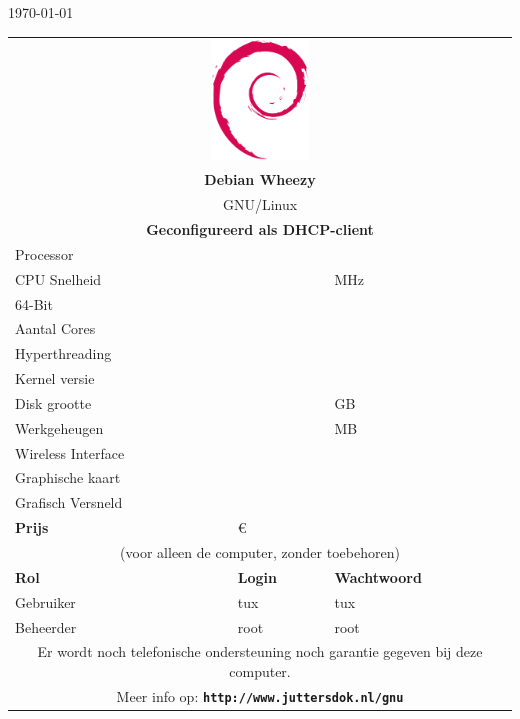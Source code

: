 \documentclass[a4paper,14pt]{extarticle}
\begin{document}

\centerline{\today}
\vskip 0.5cm
\begin{center}
	\begin{tabular}{ |p{6cm}| p{6cm}| l| }
	\multicolumn{3}{c}{\includegraphics[width=0.2\textwidth]{swirl}} \\
	\multicolumn{3}{c}{\Huge\bf{Debian Wheezy \debianversion}}\\
	\multicolumn{3}{c}{\LARGE{GNU/Linux}}\\
	\multicolumn{3}{c}{\bf Geconfigureerd als DHCP-client}\\
	\hline
	Processor & \multicolumn{2}{l|}{\cpumodel{}}  \\
	CPU Snelheid & \cpuspeed{} & MHz \\
	64-Bit & \bitssixtyfour{} & \\
	Aantal Cores & \corecount{} & \\
	Hyperthreading & \hyperthreading{} & \\
	Kernel versie & {} & \\
	Disk grootte & \disksize{} & GB \\
	Werkgeheugen & \memsize{} & MB \\
	Wireless Interface & \wireless & \\
	Graphische kaart & \multicolumn{2}{l|}{\graphics{}}  \\
	Grafisch Versneld & \accelerated{} & \\
	\hline
	{\bf Prijs}		& \euro{}{\price{}} &  \\
	\hline
	\multicolumn{3}{|c|}{(voor alleen de computer, zonder toebehoren)}\\
	\hline
	\hline
	\textbf{Rol} & \textbf{Login} & \textbf{Wachtwoord} \\
	\hline
	Gebruiker    & tux            & tux \\
	Beheerder    & root					  & root \\
	\hline
	\multicolumn{3}{c}{Er wordt noch telefonische ondersteuning noch garantie gegeven bij deze computer.}\\
	\multicolumn{3}{c}{Meer info op: \textbf{\texttt{http://www.juttersdok.nl/gnu}}}\\

\end{tabular}
\end{center}
\end{document}

